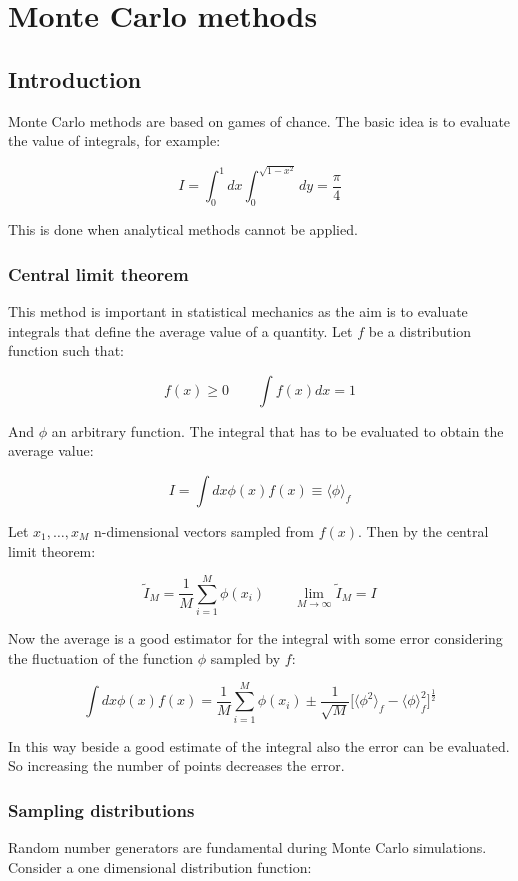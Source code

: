 \graphicspath{{chapters/17/images/}}
\chapter{Monte Carlo methods}

\section{Introduction}
Monte Carlo methods are based on games of chance.
The basic idea is to evaluate the value of integrals, for example:

$$I = \int_0^1dx\int_0^{\sqrt{1-x^2}}dy = \frac{\pi}{4}$$

This is done when analytical methods cannot be applied.

	\subsection{Central limit theorem}
	This method is important in statistical mechanics as the aim is to evaluate integrals that define the average value of a quantity.
	Let $f$ be a distribution function such that:

	$$f(x)\ge 0\qquad \int f(x)dx = 1$$

	And $\phi$ an arbitrary function.
	The integral that has to be evaluated to obtain the average value:

	$$I = \int dx\phi(x)f(x)\equiv\langle\phi\rangle_f$$

	Let $x_1, \dots, x_M$ n-dimensional vectors sampled from $f(x)$.
	Then by the central limit theorem:

	$$\tilde{I}_M = \frac{1}{M}\sum\limits_{i=1}^M\phi(x_i)\qquad \lim\limits_{M\rightarrow\infty}\tilde{I}_M = I$$

	Now the average is a good estimator for the integral with some error considering the fluctuation of the function $\phi$ sampled by $f$:

	$$\int dx\phi(x)f(x) = \frac{1}{M}\sum\limits_{i=1}^M\phi(x_i)\pm\frac{1}{\sqrt{M}}\bigl[\langle\phi^2\rangle_f-\langle\phi\rangle_f^2\bigr]^{\frac{1}{2}}$$

	In this way beside a good estimate of the integral also the error can be evaluated.
	So increasing the number of points decreases the error.

	\subsection{Sampling distributions}
	Random number generators are fundamental during Monte Carlo simulations.
	Consider a one dimensional distribution function:

